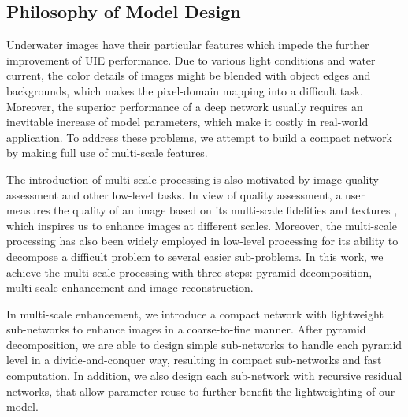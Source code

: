 \documentclass[journal]{IEEEtran}
\begin{document}
\subsection{Philosophy of Model Design}
Underwater images have their particular features which impede the further improvement of UIE performance. Due to various light conditions and water current, the color details of images might be blended with object edges and backgrounds, which makes the pixel-domain mapping into a difficult task. Moreover, the superior performance of a deep network usually requires an inevitable increase of model parameters, which make it costly in real-world application. To address these problems, we attempt to build a compact network by making full use of multi-scale features.

The introduction of multi-scale processing is also motivated by image quality assessment and other low-level tasks. In view of quality assessment, a user measures the quality of an image based on its multi-scale fidelities and textures \cite{wang2003multiscale}, which inspires us to enhance images at different scales. Moreover, the multi-scale processing has also been widely employed in low-level processing for its ability to decompose a difficult problem to several easier sub-problems. In this work, we achieve the multi-scale processing with three steps: pyramid decomposition, multi-scale enhancement and image reconstruction.

In multi-scale enhancement, we introduce a compact network with lightweight sub-networks to enhance images in a coarse-to-fine manner. After pyramid decomposition, we are able to design simple sub-networks to handle each pyramid level in a divide-and-conquer way, resulting in compact sub-networks and fast computation. In addition, we also design each sub-network with recursive residual networks, that allow parameter reuse to further benefit the lightweighting of our model.
 
\end{document}
